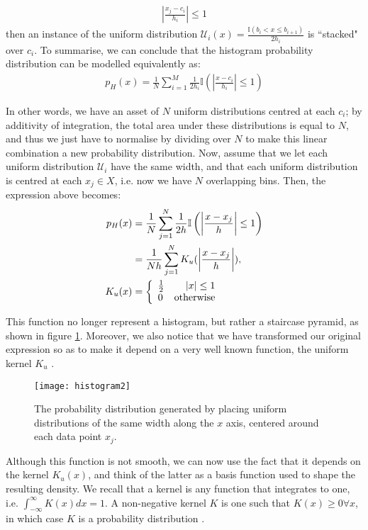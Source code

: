 \documentclass[../main.tex]{subfiles}
\begin{document}
\begin{align*}
\left|\frac{x_j - c_i}{h_i}\right| \leq 1
\end{align*}
then an instance of the uniform distribution $\mathcal{U}_i(x) = \frac{\mathbb{I}(b_i < x \leq b_{i+1})}{2h_i}$ is ``stacked" over $c_i$. To summarise, we can conclude that the histogram probability distribution can be modelled equivalently as:
\begin{align*}
p_H(x) = \frac{1}{N}\sum_{i=1}^M\frac{1}{2h_i}\mathbb{I}\left(\left|\frac{x - c_i}{h_i}\right| \leq 1\right)
\end{align*}
\par In other words, we have an asset of $N$ uniform distributions centred at each $c_i$; by additivity of integration, the total area under these distributions is equal to $N$, and thus we just have to normalise by dividing over $N$ to make this linear combination a new probability distribution. Now, assume that we let each uniform distribution $\mathcal{U}_i$ have the same width, and that each uniform distribution is centred at each $x_j \in X$, i.e. now we have $N$ overlapping bins. Then, the expression above becomes:
\begin{align*}
p_{H}(x) &= \frac{1}{N}\sum_{j=1}^N\frac{1}{2h}\mathbb{I}\left(\left|\frac{x - x_j}{h}\right| \leq 1\right)\\
&= \frac{1}{Nh}\sum_{j=1}^NK_u(\left|\frac{x - x_j}{h}\right|),\\
K_u(x) &= \left\{
     \begin{array}{lr}
      \frac{1}{2} & \lvert x\rvert \leq 1 \\
      0 & \text{otherwise} 
     \end{array}
   \right.
\end{align*}
\par This function no longer represent a histogram, but rather a staircase pyramid, as shown in figure \ref{fig_hist2}. Moreover, we also notice that we have transformed our original expression so as to make it depend on a very well known function, the uniform kernel $K_u$ \cite{Hansen2009}. 
\begin{figure}[t]
\centering
\texttt{[image: histogram2]}
\caption{The probability distribution generated by placing uniform distributions of the same width along the $x$ axis, centered around each data point $x_j$.}
\label{fig_hist2}
\end{figure}
\par Although this function is not smooth, we can now use the fact that it depends on the kernel $K_u(x)$, and think of the latter as a basis function used to shape the resulting density. We recall that a kernel is any function that integrates to one, i.e. $\int_{-\infty}^\infty K(x)dx = 1$. A non-negative kernel $K$ is one such that $K(x) \geq 0 \forall x$, in which case $K$ is a probability distribution \cite{Hansen2009}.
\end{document}
